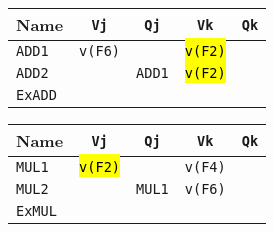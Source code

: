 \begin{enumerate}
    \begin{table}[!htp]
        \centering
        \begin{tabular}{@{} l | c c c c @{}}
            \toprule
            Name            & \texttt{Vj}           & \texttt{Qj}                       & \texttt{Vk}           & \texttt{Qk}           \\
            \midrule
            \texttt{ADD1}   & \texttt{v(F6)}        &                                   & \hl{\texttt{v(F2)}}   &                       \\ [.3em]
            \texttt{ADD2}   &                       & \texttt{ADD1}                     & \hl{\texttt{v(F2)}}   &                       \\
            \cmidrule{1-5}
            \texttt{ExADD}  &                       &                                   &                       &                       \\
            \bottomrule
        \end{tabular}
    \end{table}

    \newpage
    
    \begin{table}[!htp]
            \centering
            \begin{tabular}{@{} l | c c c c @{}}
                \toprule
                Name            & \texttt{Vj}           & \texttt{Qj}           & \texttt{Vk}           & \texttt{Qk}   \\
                \midrule
                \texttt{MUL1}   & \hl{\texttt{v(F2)}}   &                       & \texttt{v(F4)}        &               \\ [.3em]
                \texttt{MUL2}   &                       & \texttt{MUL1}         & \texttt{v(F6)}        &               \\
                \cmidrule{1-5}
                \texttt{ExMUL}  &                       &                       &                       &               \\
                \bottomrule
            \end{tabular}
    \end{table}


\end{enumerate}
